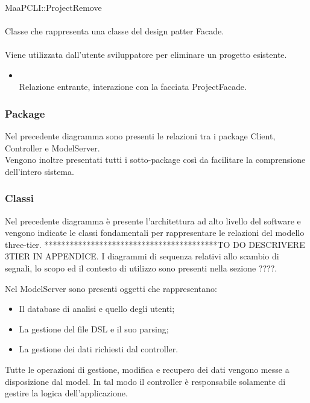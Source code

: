 	\\
	MaaPCLI::ProjectRemove\\
	\\
	Classe che rappresenta una classe del design patter Facade.\\
	\\
	Viene utilizzata dall'utente sviluppatore per eliminare un progetto esistente.\\
	\begin{itemize}
	\item{}\\
	Relazione entrante, interazione con la facciata ProjectFacade.
	\end{itemize}

\subsubsection{Package}
Nel precedente diagramma sono presenti le relazioni tra i package Client, Controller e ModelServer.\\
Vengono inoltre presentati tutti i sotto-package così da facilitare la comprensione dell'intero sistema.

\subsubsection{Classi}
Nel precedente diagramma è presente l'architettura ad alto livello del software e vengono indicate le classi fondamentali per rappresentare le relazioni del modello  three-tier. *****************************************TO DO DESCRIVERE 3TIER IN APPENDICE. I diagrammi di sequenza relativi allo scambio di segnali, lo scopo ed il contesto di utilizzo sono presenti nella sezione ????.

Nel ModelServer sono presenti oggetti che rappresentano:
\begin{itemize}
\item Il database di analisi e quello degli utenti;
\item La gestione del file DSL e il suo parsing;
\item La gestione dei dati richiesti dal controller.
\end{itemize}
Tutte le operazioni di gestione, modifica e recupero dei dati vengono messe a disposizione dal model. In tal modo il controller è responsabile solamente di gestire la logica dell'applicazione.

